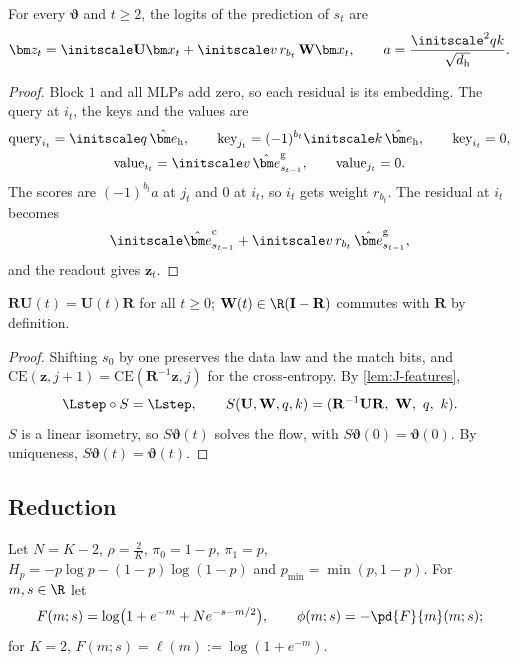 \begin{lemma}
\label{lem:J-features}
For every $\bm\vartheta$ and $t\ge2$, the logits of the prediction of $s_t$ are
\[
 \bm z_t=\initscale \mathbf U\bm x_t+\initscale v\,r_{b_t}\,\mathbf W\bm x_t,\qquad a=\frac{\initscale^2qk}{\sqrt{d_{\mathrm h}}}.
\]
\end{lemma}

\begin{proof}
Block $1$ and all MLPs add zero, so each residual is its embedding. The query at $i_t$, the keys and the values are
\begin{gather*}
 \text{query}_{i_t}=\initscale q\,\hat{\bm e}_{\mathrm h},\qquad \text{key}_{j_t}=(-1)^{b_t}\initscale k\,\hat{\bm e}_{\mathrm h},\qquad \text{key}_{i_t}=0,\\
 \text{value}_{i_t}=\initscale v\,\hat{\bm e}^{\mathrm g}_{s_{t-1}},\qquad \text{value}_{j_t}=0 .
\end{gather*}
The scores are $(-1)^{b_t}a$ at $j_t$ and $0$ at $i_t$, so $i_t$ gets weight $r_{b_t}$. The residual at $i_t$ becomes
\[
 \initscale\hat{\bm e}^{\mathrm c}_{s_{t-1}}+\initscale v\,r_{b_t}\,\hat{\bm e}^{\mathrm g}_{s_{t-1}},
\]
and the readout gives $\bm z_t$.
\end{proof}

\begin{lemma}
\label{lem:J-symmetry}
$\mathbf R\mathbf U(t)=\mathbf U(t)\mathbf R$ for all $t\ge0$; $\mathbf W(t)\in\R(\mathbf I-\mathbf R)$ commutes with $\mathbf R$ by definition.
\end{lemma}

\begin{proof}
Shifting $s_0$ by one preserves the data law and the match bits, and $\mathrm{CE}(\bm z,j+1)=\mathrm{CE}(\mathbf R^{-1}\bm z,j)$ for the cross-entropy. By \cref{lem:J-features},
\[
 \Lstep\circ S=\Lstep,\qquad S(\mathbf U,\mathbf W,q,k)=(\mathbf R^{-1}\mathbf U\mathbf R,\ \mathbf W,\ q,\ k).
\]
$S$ is a linear isometry, so $S\bm\vartheta(t)$ solves the flow, with $S\bm\vartheta(0)=\bm\vartheta(0)$. By uniqueness, $S\bm\vartheta(t)=\bm\vartheta(t)$.
\end{proof}

\subsection{Reduction}

Let $N=K-2$, $\rho=\frac{2}{K}$, $\pi_0=1-p$, $\pi_1=p$, $H_p=-p\log p-(1-p)\log(1-p)$ and $p_{\min}=\min(p,1-p)$. For $m,s\in\R$ let
\[
 F(m;s)=\log\bigl(1+e^{-m}+N e^{-s-m/2}\bigr),\qquad \phi(m;s)=-\pd{F}{m}(m;s);
\]
for $K=2$, $F(m;s)=\ell(m):=\log(1+e^{-m})$.

